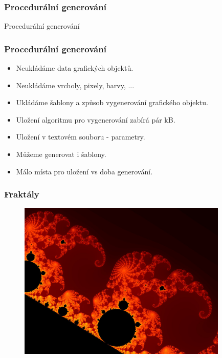 \begin{frame}
  \frametitle{Procedurální generování}
  \begin{center}
    \Huge {\color{white}Procedurální generování}
  \end{center}
\end{frame}

\begin{frame}
\frametitle{Procedurální generování}
	\begin{itemize}
	\item{Neukládáme data grafických objektů.}
	\item{Neukládáme vrcholy, pixely, barvy, ...}
	\item{Ukládáme šablony a způsob vygenerování grafického objektu.}
	\item{Uložení algoritmu pro vygenerování zabírá pár kB.}
	\item{Uložení v textovém souboru - parametry.}
	\item{Můžeme generovat i šablony.}
	\item{Málo místa pro uložení vs doba generování.}
	\end{itemize}
\end{frame}

\begin{frame}
\frametitle{Fraktály}
	\begin{figure}[h]
		\includegraphics[width=10cm,keepaspectratio]{pics/procedural/fractal.jpg}
	\end{figure}
\end{frame}

